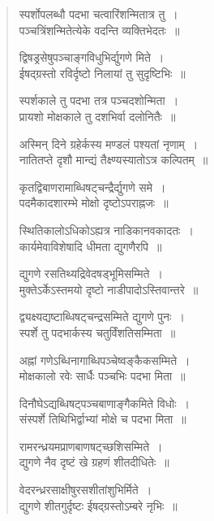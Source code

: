 \documentclass[11pt, openany]{book}
\begin{document}
\newpage

\begin{quote}
{\qt स्पर्शोपलब्धौ पदभा चत्वारिंशन्मितात्र तु~।\\
पञ्चत्रिंशन्मितेत्येके वदन्ति व्यक्तिभेदतः~॥

द्विषड्रसेषुपञ्चाङ्गविधुभिर्द्युगणे मिते~।\\
ईषद्ग्रस्तो रविर्दृष्टो निलायां तु सुदृष्टिभिः~॥

स्पर्शकाले तु पदभा तत्र पञ्चदशोन्मिता~।\\
प्रायशो मोक्षकाले तु दशभिर्वा दलोनितैः~॥

अस्मिन् दिने ग्रहेर्कस्य मण्डलं पश्यतां नृणाम्~।\\
नातितप्ते दृशौ मान्द्यं तैक्ष्ण्यस्यातोऽत्र कल्पितम्~॥

कृतद्विबाणरामाब्धिषट्चन्द्रैर्द्युगणे समे~।\\
पदमैकादशारम्भे मोक्षो दृष्टोऽपराह्नजः~॥

स्थितिकालोऽधिकोऽह्यत्र नाडिकानवकादतः~।\\
कार्यमेवाविशेषादि धीमता द्युगणैरपि~॥

द्युगणे रसतिथ्यद्रिवेदषड्भूमिसम्मिते~।\\
मुक्तेऽर्केऽस्तमयो दृष्टो नाडीपादोऽस्तिवान्तरे~॥

द्व्यक्ष्यद्यष्टाब्धिषट्चन्द्रसम्मिते द्युगणे पुनः~।\\
स्पर्शे तु पदभार्कस्य चतुर्विंशतिसम्मिता~॥

अह्नां गणेऽब्धिनागाब्धिपञ्चेष्वङ्कैकसम्मिते~।\\
मोक्षकालो रवेः सार्धैः पञ्चभिः पदभा मिता~॥

दिनौघेऽद्यब्धिषट्पञ्चबाणाङ्गैकमिते विधोः~।\\
संस्पर्शे तिथिभिर्द्वाभ्यां मोक्षे च पदभा मिता~॥

रामरन्ध्रयमप्राणबाणषट्च्छशिसम्मिते~।\\
द्युगणे नैव दृष्टं खे ग्रहणं शीतदीधितेः~॥

वेदरन्ध्ररसाक्षीषुरसशीतांशुभिर्मिते~।\\
द्युगणे शीतगुर्दृष्टः ईषद्ग्रस्तोऽम्बरे नृभिः~॥}
\end{quote}

\newpage
\end{document}
